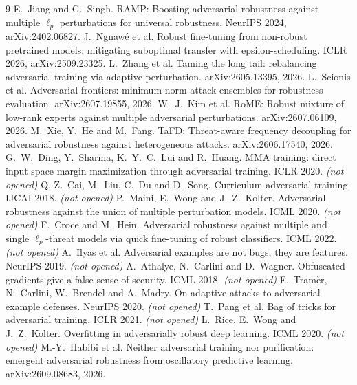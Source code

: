 \documentclass[11pt]{article}
\begin{document}
\begin{thebibliography}{9}
 E.~Jiang and G.~Singh. RAMP: Boosting adversarial robustness against multiple $\ell_p$ perturbations for universal robustness. NeurIPS 2024, arXiv:2402.06827.
 J.~Ngnaw\'e et al. Robust fine-tuning from non-robust pretrained models: mitigating suboptimal transfer with epsilon-scheduling. ICLR 2026, arXiv:2509.23325.
 L.~Zhang et al. Taming the long tail: rebalancing adversarial training via adaptive perturbation. arXiv:2605.13395, 2026.
 L.~Scionis et al. Adversarial frontiers: minimum-norm attack ensembles for robustness evaluation. arXiv:2607.19855, 2026.
 W.~J.~Kim et al. RoME: Robust mixture of low-rank experts against multiple adversarial perturbations. arXiv:2607.06109, 2026.
 M.~Xie, Y.~He and M.~Fang. TaFD: Threat-aware frequency decoupling for adversarial robustness against heterogeneous attacks. arXiv:2606.17540, 2026.
 G.~W.~Ding, Y.~Sharma, K.~Y.~C.~Lui and R.~Huang. MMA training: direct input space margin maximization through adversarial training. ICLR 2020. \emph{(not opened)}
 Q.-Z.~Cai, M.~Liu, C.~Du and D.~Song. Curriculum adversarial training. IJCAI 2018. \emph{(not opened)}
 P.~Maini, E.~Wong and J.~Z.~Kolter. Adversarial robustness against the union of multiple perturbation models. ICML 2020. \emph{(not opened)}
 F.~Croce and M.~Hein. Adversarial robustness against multiple and single $\ell_p$-threat models via quick fine-tuning of robust classifiers. ICML 2022. \emph{(not opened)}
 A.~Ilyas et al. Adversarial examples are not bugs, they are features. NeurIPS 2019. \emph{(not opened)}
 A.~Athalye, N.~Carlini and D.~Wagner. Obfuscated gradients give a false sense of security. ICML 2018. \emph{(not opened)}
 F.~Tram\`er, N.~Carlini, W.~Brendel and A.~Madry. On adaptive attacks to adversarial example defenses. NeurIPS 2020. \emph{(not opened)}
 T.~Pang et al. Bag of tricks for adversarial training. ICLR 2021. \emph{(not opened)}
 L.~Rice, E.~Wong and J.~Z.~Kolter. Overfitting in adversarially robust deep learning. ICML 2020. \emph{(not opened)}
 M.-Y.~Habibi et al. Neither adversarial training nor purification: emergent adversarial robustness from oscillatory predictive learning. arXiv:2609.08683, 2026.
\end{thebibliography}
\end{document}
